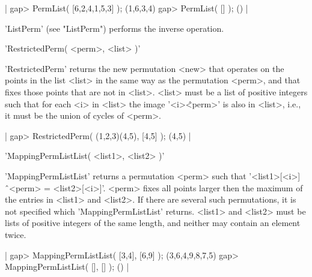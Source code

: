 |    gap> PermList( [6,2,4,1,5,3] );
    (1,6,3,4)
    gap> PermList( [] );
    () |

'ListPerm' (see "ListPerm") performs the inverse operation.


'RestrictedPerm( <perm>, <list> )'

'RestrictedPerm'  returns the new permutation <new> that  operates on the
points  in the list <list> in the same way as the permutation <perm>, and
that fixes those points that are not in <list>.  <list> must be a list of
positive  integers  such  that  for  each   <i>  in  <list>   the   image
'<i>\^<perm>' is also in <list>, i.e., it must be  the union of cycles of
<perm>.

|    gap> RestrictedPerm( (1,2,3)(4,5), [4,5] );
    (4,5) |


'MappingPermListList( <list1>, <list2> )'

'MappingPermListList'   returns   a   permutation   <perm>    such   that
'<list1>[<i>] \^\ <perm> = <list2>[<i>]'.  <perm> fixes all points larger
then the  maximum  of the  entries in <list1> and <list2>.  If there  are
several    such    permutations,    it    is    not    specified    which
'MappingPermListList' returns.  <list1>  and  <list2>  must  be lists  of
positive integers  of the same length, and neither may contain an element
twice.

|    gap> MappingPermListList( [3,4], [6,9] );
    (3,6,4,9,8,7,5)
    gap> MappingPermListList( [], [] );
    () |




